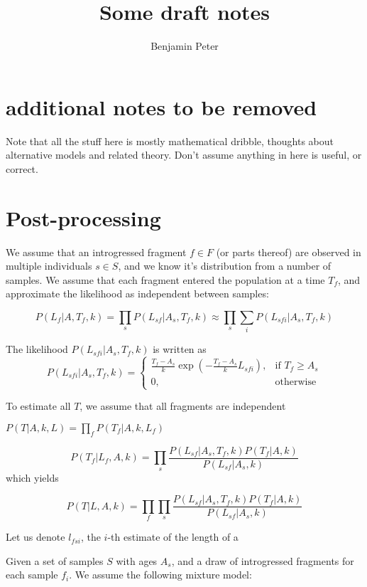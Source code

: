 \documentclass[10pt,a4paper]{article}
\author{Benjamin Peter}
\title{Some draft notes}
\begin{document}
	\maketitle
\section{additional notes to be removed}
Note that all the stuff here is mostly mathematical dribble, thoughts about alternative models and related theory. Don't assume anything in here is useful, or correct.
\section{Post-processing}
We assume that an introgressed fragment $f \in F$ (or parts thereof) are observed in multiple individuals $s \in S$, and we know it's distribution from a number of samples. We assume that each fragment entered the population at a time $T_f$, and approximate the likelihood as independent between samples:

$$P(L_f | A, T_f, k) = \prod_s P(L_{sf} | A_s, T_f, k) \approx \prod_s \sum_i P(L_{sfi} | A_s, T_f, k)$$

The likelihood $P(L_{sfi} | A_s, T_f, k)$ is written as
\begin{equation}
P(L_{sfi} | A_s, T_f, k) = 
\begin{cases}
\frac{T_f - A_s}{k} \exp\left(- \frac{T_f - A_s}{k} L_{sfi}\right)  ,& \text{if } T_f \geq A_s \\
0,              & \text{otherwise}
\end{cases}
\end{equation}

To estimate all $T$, we assume that all fragments are independent

$P(T | A, k, L) = \prod_f P(T_f | A, k, L_f)$

\begin{equation}
P(T_f | L_{f}, A, k) = \prod_s
\frac{P(L_{sf} | A_s, T_f, k)P(T_f | A, k)}{P(L_{sf} | A_s, k)}
\end{equation}
which yields

\begin{equation}
P(T | L, A, k) = \prod_f\prod_s
\frac{P(L_{sf} | A_s, T_f, k)P(T_f | A, k)}{P(L_{sf} | A_s, k)}
\end{equation}



Let us denote $l_{fsi}$, the $i$-th estimate of the length of a


Given a set of samples $S$ with ages $A_s$, and a draw of introgressed fragments for each sample $f_i$. We assume the following mixture model:
\end{document}
